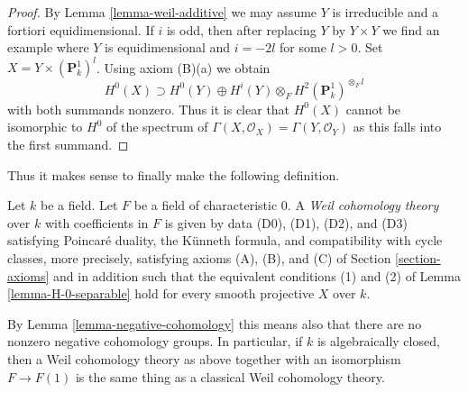 \begin{proof}
By Lemma \ref{lemma-weil-additive} we may assume $Y$ is irreducible
and a fortiori equidimensional. If $i$ is odd, then after replacing
$Y$ by $Y \times Y$ we find an example where $Y$ is equidimensional
and $i = -2l$ for some $l > 0$. Set $X = Y \times (\mathbf{P}^1_k)^l$.
Using axiom (B)(a) we obtain
$$
H^0(X) \supset H^0(Y) \oplus
H^i(Y) \otimes_F H^2(\mathbf{P}^1_k)^{\otimes_F l}
$$
with both summands nonzero. Thus it is clear that $H^0(X)$ cannot be
isomorphic to $H^0$ of the spectrum of
$\Gamma(X, \mathcal{O}_X) = \Gamma(Y, \mathcal{O}_Y)$
as this falls into the first summand.
\end{proof}

\noindent
Thus it makes sense to finally make the following definition.

\begin{definition}
\label{definition-weil-cohomology-theory}
Let $k$ be a field. Let $F$ be a field of characteristic $0$.
A {\it Weil cohomology theory} over $k$ with coefficients in $F$
is given by data (D0), (D1), (D2), and (D3) satisfying
Poincar\'e duality, the K\"unneth formula, and compatibility
with cycle classes, more precisely, satisfying axioms (A), (B), and (C)
of Section \ref{section-axioms}
and in addition such that the equivalent conditions (1) and (2) of
Lemma \ref{lemma-H-0-separable} hold for every smooth projective $X$ over $k$.
\end{definition}

\noindent
By Lemma \ref{lemma-negative-cohomology} this means also that there are no
nonzero negative cohomology groups. In particular, if $k$ is algebraically
closed, then a Weil cohomology theory as above together with an isomorphism
$F \to F(1)$ is the same thing as a classical Weil cohomology theory.

